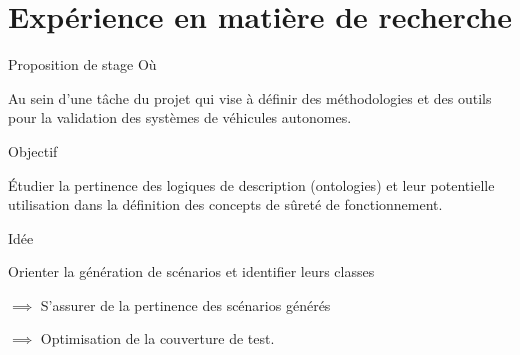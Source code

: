 \documentclass[
  hyperref={
    pdfusetitle,
    pdfencoding=auto,
    psdextra,
    colorlinks=true,
    linkcolor=darkblue,
    citecolor=darkred,
    urlcolor=darkblue,
  },
  9pt,
  aspectratio=169,
]{beamer}
\begin{document}
\section{Expérience en matière de recherche}

\begin{frame}{Proposition de stage}
  \alert{Où}

  Au sein d'une tâche du projet 
  qui vise à définir des méthodologies et des outils
  pour la validation des systèmes de véhicules autonomes.


  \alert{Objectif}

  Étudier la pertinence des logiques de description
  (ontologies)
  et leur potentielle utilisation dans la définition des concepts
  de sûreté de fonctionnement.


  \alert{Idée}

  Orienter la génération de scénarios
  et identifier leurs classes

  \(\implies\) S'assurer de la pertinence des scénarios générés

  \(\implies\) Optimisation de la couverture de test.
\end{frame}

\end{document}
